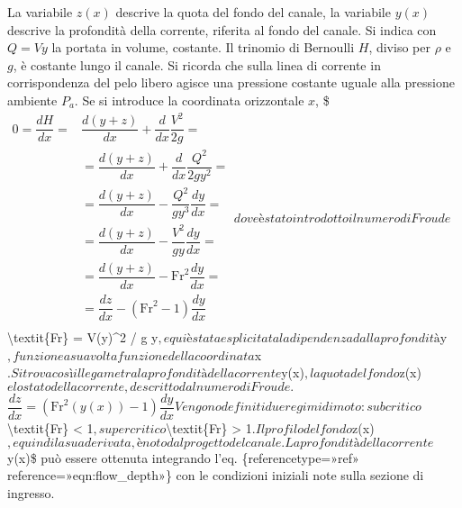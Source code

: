 \documentclass[letterpaper,10pt,italian]{jupyterBook}
\begin{document}
\sphinxAtStartPar
La variabile \(z(x)\) descrive la quota del fondo del canale, la variabile
\(y(x)\) descrive la profondità della corrente, riferita al fondo del
canale. Si indica con \(Q = V y\) la portata in volume, costante. Il
trinomio di Bernoulli \(H\), diviso per \(\rho\) e \(g\), è costante lungo il
canale. Si ricorda che sulla linea di corrente in corrispondenza del
pelo libero agisce una pressione costante uguale alla pressione ambiente
\(P_a\). Se si introduce la coordinata orizzontale \(x\), \$\(\begin{aligned}
 0 = \dfrac{d H}{d x} = 
 & \dfrac{d (y+z)}{d x} + \dfrac{d}{d x} \dfrac{V^2}{2 g}     = \\
 & = \dfrac{d (y+z)}{d x} + \dfrac{d}{d x} \dfrac{Q^2}{2 g y^2} = \\
 & = \dfrac{d (y+z)}{d x} - \dfrac{Q^2}{g y^3} \dfrac{d y}{d x} = \\
 & = \dfrac{d (y+z)}{d x} - \dfrac{V^2}{g y} \dfrac{d y}{d x} = \\ 
 & = \dfrac{d (y+z)}{d x} - \text{Fr}^2 \dfrac{d y}{d x} = \\ 
 & = \dfrac{d z}{d x} - (\text{Fr}^2 - 1) \dfrac{d y}{d x} \\ 
\end{aligned}\)\( dove è stato introdotto il numero di Froude
\)\textbackslash{}textit\{Fr\} = V(y)\textasciicircum{}2 / g y\(, e qui è stata esplicitata la dipendenza
dalla profondità \)y\(, funzione a sua volta funzione della coordinata
\)x\(. Si trova così il legame tra la profondità della corrente \)y(x)\(, la
quota del fondo \)z(x)\( e lo stato della corrente, descritto dal numero
di Froude. \)\(\label{eqn:flow_depth}
 \dfrac{d z}{d x} = (\text{Fr}^2(y(x)) - 1) \dfrac{d y}{d x}\)\( Vengono
definiti due regimi di moto: subcritico \)\textbackslash{}textit\{Fr\} < 1\(, supercritico
\)\textbackslash{}textit\{Fr\} > 1\(. Il profilo del fondo \)z(x)\(, e quindi la sua
derivata, è noto dal progetto del canale. La profondità della corrente
\)y(x)\$ può essere ottenuta integrando l’eq.
\{reference\sphinxhyphen{}type=»ref»
reference=»eqn:flow\_depth»\} con le condizioni iniziali note sulla
sezione di ingresso.
\end{document}
